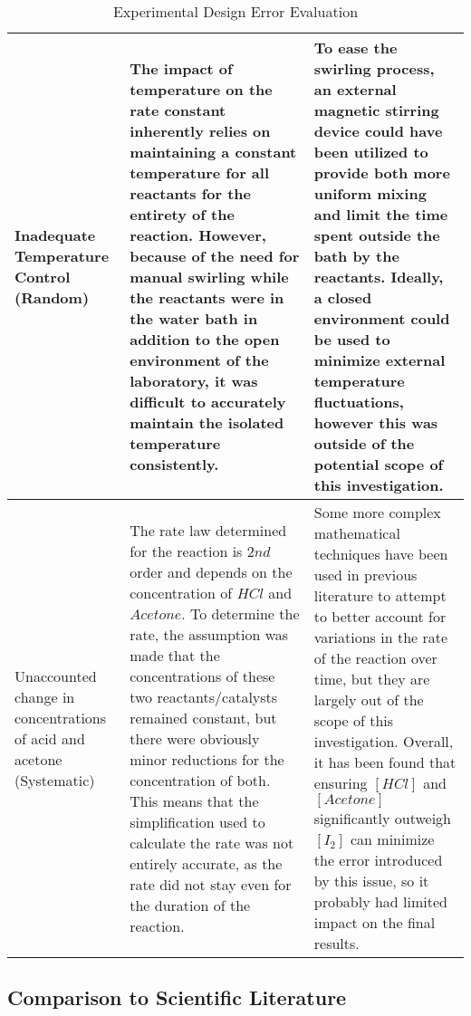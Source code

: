 \begin{table}[h!]
\begin{tabular}{|p{3cm}|p{7cm}|p{7cm}|}
 \hline
 Inadequate Temperature Control (Random) & The impact of temperature on the rate constant inherently relies on maintaining a constant temperature for all reactants for the entirety of the reaction. However, because of the need for manual swirling while the reactants were in the water bath in addition to the open environment of the laboratory, it was difficult to accurately maintain the isolated temperature consistently. &  To ease the swirling process, an external magnetic stirring device could have been utilized to provide both more uniform mixing and limit the time spent outside the bath by the reactants. Ideally, a closed environment could be used to minimize external temperature fluctuations, however this was outside of the potential scope of this investigation. \\
 \hline
  Unaccounted change in concentrations of acid and acetone (Systematic) & The rate law determined for the reaction is $2nd$ order and depends on the concentration of $HCl$ and $Acetone$. To determine the rate, the assumption was made that the concentrations of these two reactants/catalysts remained constant, but there were obviously minor reductions for the concentration of both. This means that the simplification used to calculate the rate was not entirely accurate, as the rate did not stay even for the duration of the reaction. &  Some more complex mathematical techniques have been used in previous literature to attempt to better account for variations in the rate of the reaction over time, but they are largely out of the scope of this investigation. Overall, it has been found that ensuring $[HCl]$ and $[Acetone]$ significantly outweigh $[I_2]$ can minimize the error introduced by this issue, so it probably had limited impact on the final results.\\
 \hline

\end{tabular}
\caption{Experimental Design Error Evaluation}
\label{table:experimental_design_error_evaluation}
\end{table}

\subsection{Comparison to Scientific Literature}

